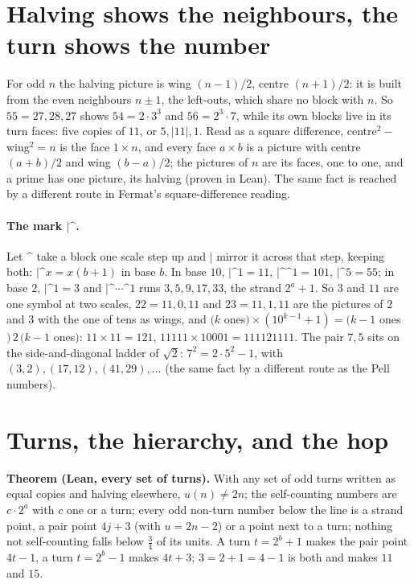 \documentclass[11pt]{article}
\begin{document}
\section{Halving shows the neighbours, the turn shows the number}
For odd $n$ the halving picture is wing $(n-1)/2$, centre $(n+1)/2$: it is built from the even neighbours $n\pm1$, the left-outs, which share no block with $n$. So $55 = 27,28,27$ shows $54 = 2\cdot3^3$ and $56 = 2^3\cdot7$, while its own blocks live in its turn faces: five copies of $11$, or $5,|11|,1$. Read as a square difference, centre$^2-$wing$^2 = n$ is the face $1\times n$, and every face $a\times b$ is a picture with centre $(a+b)/2$ and wing $(b-a)/2$; the pictures of $n$ are its faces, one to one, and a prime has one picture, its halving (proven in Lean). The same fact is reached by a different route in Fermat's square-difference reading.

\paragraph{The mark $|\text{\textasciicircum}$.} Let $\text{\textasciicircum}$ take a block one scale step up and $|$ mirror it across that step, keeping both: $|\text{\textasciicircum}x = x(b+1)$ in base $b$. In base $10$, $|\text{\textasciicircum}1 = 11$, $|\text{\textasciicircum}\text{\textasciicircum}1 = 101$, $|\text{\textasciicircum}5 = 55$; in base $2$, $|\text{\textasciicircum}1 = 3$ and $|\text{\textasciicircum}\cdots\text{\textasciicircum}1$ runs $3, 5, 9, 17, 33$, the strand $2^a+1$. So $3$ and $11$ are one symbol at two scales, $22 = 11,0,11$ and $23 = 11,1,11$ are the pictures of $2$ and $3$ with the one of tens as wings, and $(k$ ones$)\times(10^{k-1}+1) = (k-1$ ones$)\,2\,(k-1$ ones$)$: $11\times11 = 121$, $11111\times10001 = 111121111$. The pair $7, 5$ sits on the side-and-diagonal ladder of $\sqrt2$: $7^2 = 2\cdot5^2 - 1$, with $(3,2), (17,12), (41,29), \dots$ (the same fact by a different route as the Pell numbers).

\section{Turns, the hierarchy, and the hop}
\textbf{Theorem (Lean, every set of turns).} With any set of odd turns written as equal copies and halving elsewhere, $u(n)\ne 2n$; the self-counting numbers are $c\cdot2^a$ with $c$ one or a turn; every odd non-turn number below the line is a strand point, a pair point $4j+3$ (with $u = 2n-2$) or a point next to a turn; nothing not self-counting falls below $\tfrac34$ of its units. A turn $t = 2^b+1$ makes the pair point $4t-1$, a turn $t = 2^b-1$ makes $4t+3$; $3 = 2+1 = 4-1$ is both and makes $11$ and $15$.
\end{document}
